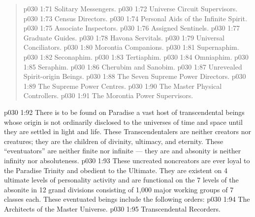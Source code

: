 \begin{quote}
\vs p030 1:71 \bibnobreakspace Solitary Messengers.
\vs p030 1:72 \bibnobreakspace Universe Circuit Supervisors.
\vs p030 1:73 \bibnobreakspace Census Directors.
\vs p030 1:74 \bibnobreakspace Personal Aids of the Infinite Spirit.
\vs p030 1:75 \bibnobreakspace Associate Inspectors.
\vs p030 1:76 \bibnobreakspace Assigned Sentinels.
\vs p030 1:77 \bibnobreakspace Graduate Guides.
\vs p030 1:78 \bibnobreakspace Havona Servitals.
\vs p030 1:79 \bibnobreakspace Universal Conciliators.
\vs p030 1:80 \bibnobreakspace Morontia Companions.
\vs p030 1:81 \bibnobreakspace Supernaphim.
\vs p030 1:82 \bibnobreakspace Seconaphim.
\vs p030 1:83 \bibnobreakspace Tertiaphim.
\vs p030 1:84 \bibnobreakspace Omniaphim.
\vs p030 1:85 \bibnobreakspace Seraphim.
\vs p030 1:86 \bibnobreakspace Cherubim and Sanobim.
\vs p030 1:87 \bibnobreakspace Unrevealed Spirit\hyp{}origin Beings.
\vs p030 1:88 \bibnobreakspace The Seven Supreme Power Directors.
\vs p030 1:89 \bibnobreakspace The Supreme Power Centres.
\vs p030 1:90 \bibnobreakspace The Master Physical Controllers.
\vs p030 1:91 \bibnobreakspace The Morontia Power Supervisors.
\end{quote}
\vsetspace
\vs p030 1:92 \bibnobreakspace {} There is to be found on Paradise a vast host of transcendental beings whose origin is not ordinarily disclosed to the universes of time and space until they are settled in light and life. These Transcendentalers are neither creators nor creatures; they are the  children of divinity, ultimacy, and eternity. These “eventuators” are neither finite nor infinite --- they are  and absonity is neither infinity nor absoluteness.
\vs p030 1:93 These uncreated noncreators are ever loyal to the Paradise Trinity and obedient to the Ultimate. They are existent on 4 ultimate levels of personality activity and are functional on the 7 levels of the absonite in 12 grand divisions consisting of 1,000 major working groups of 7 classes each. These eventuated beings include the following orders:
\vs p030 1:94 \bibnobreakspace The Architects of the Master Universe.
\vs p030 1:95 \bibnobreakspace Transcendental Recorders.
